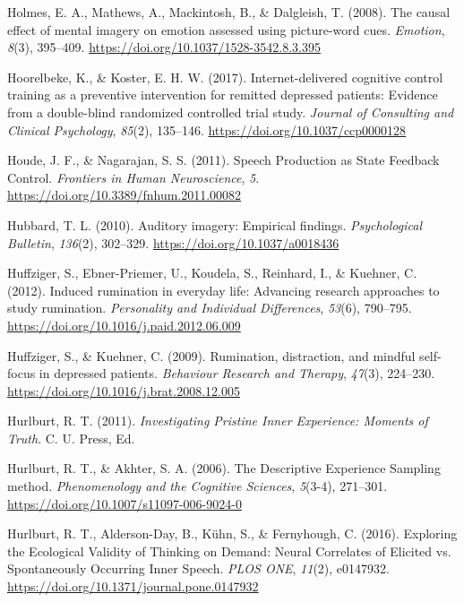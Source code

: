 \documentclass[a4paper,12pt,twoside,openright,oldfontcommands,final]{memoir}
\begin{document}
\leavevmode\hypertarget{ref-holmes_causal_2008}{}%
Holmes, E. A., Mathews, A., Mackintosh, B., \& Dalgleish, T. (2008). The causal effect of mental imagery on emotion assessed using picture-word cues. \emph{Emotion}, \emph{8}(3), 395--409. \url{https://doi.org/10.1037/1528-3542.8.3.395}

\leavevmode\hypertarget{ref-hoorelbeke_internet-delivered_2017}{}%
Hoorelbeke, K., \& Koster, E. H. W. (2017). Internet-delivered cognitive control training as a preventive intervention for remitted depressed patients: Evidence from a double-blind randomized controlled trial study. \emph{Journal of Consulting and Clinical Psychology}, \emph{85}(2), 135--146. \url{https://doi.org/10.1037/ccp0000128}

\leavevmode\hypertarget{ref-houde_speech_2011}{}%
Houde, J. F., \& Nagarajan, S. S. (2011). Speech Production as State Feedback Control. \emph{Frontiers in Human Neuroscience}, \emph{5}. \url{https://doi.org/10.3389/fnhum.2011.00082}

\leavevmode\hypertarget{ref-hubbard_auditory_2010}{}%
Hubbard, T. L. (2010). Auditory imagery: Empirical findings. \emph{Psychological Bulletin}, \emph{136}(2), 302--329. \url{https://doi.org/10.1037/a0018436}

\leavevmode\hypertarget{ref-Huffziger2012}{}%
Huffziger, S., Ebner-Priemer, U., Koudela, S., Reinhard, I., \& Kuehner, C. (2012). Induced rumination in everyday life: Advancing research approaches to study rumination. \emph{Personality and Individual Differences}, \emph{53}(6), 790--795. \url{https://doi.org/10.1016/j.paid.2012.06.009}

\leavevmode\hypertarget{ref-Huffziger2009}{}%
Huffziger, S., \& Kuehner, C. (2009). Rumination, distraction, and mindful self-focus in depressed patients. \emph{Behaviour Research and Therapy}, \emph{47}(3), 224--230. \url{https://doi.org/10.1016/j.brat.2008.12.005}

\leavevmode\hypertarget{ref-Hurlburt2011}{}%
Hurlburt, R. T. (2011). \emph{Investigating Pristine Inner Experience: Moments of Truth}. C. U. Press, Ed.

\leavevmode\hypertarget{ref-hurlburt_descriptive_2006}{}%
Hurlburt, R. T., \& Akhter, S. A. (2006). The Descriptive Experience Sampling method. \emph{Phenomenology and the Cognitive Sciences}, \emph{5}(3-4), 271--301. \url{https://doi.org/10.1007/s11097-006-9024-0}

\leavevmode\hypertarget{ref-hurlburt_exploring_2016}{}%
Hurlburt, R. T., Alderson-Day, B., Kühn, S., \& Fernyhough, C. (2016). Exploring the Ecological Validity of Thinking on Demand: Neural Correlates of Elicited vs. Spontaneously Occurring Inner Speech. \emph{PLOS ONE}, \emph{11}(2), e0147932. \url{https://doi.org/10.1371/journal.pone.0147932}
\end{document}
